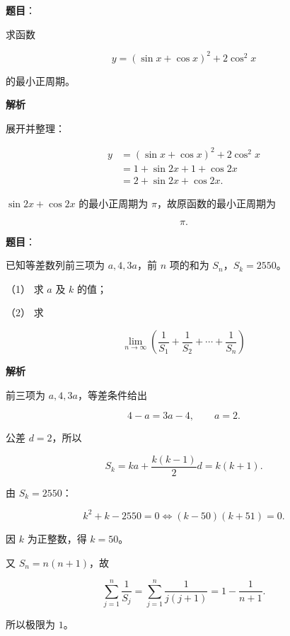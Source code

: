 \begin{answer}

\textbf{题目}：

求函数

\nopagebreak[4]
\[
y=(\sin x+\cos x)^2+2\cos^2x
\]

的最小正周期。

\textbf{解析}

展开并整理：

\nopagebreak[4]
\[
\begin{aligned}
y
&=(\sin x+\cos x)^2+2\cos^2x\\
&=1+\sin2x+1+\cos2x\\
&=2+\sin2x+\cos2x.
\end{aligned}
\]

$\sin2x+\cos2x$ 的最小正周期为 $\pi$，故原函数的最小正周期为

\nopagebreak[4]
\[
\pi.
\]


\end{answer}
\begin{answer}

\textbf{题目}：

已知等差数列前三项为 $a,4,3a$，前 $n$ 项的和为 $S_n$，$S_k=2550$。

（1） 求 $a$ 及 $k$ 的值；

（2） 求

\nopagebreak[4]
\[
\lim_{n\to\infty}\left(\frac1{S_1}+\frac1{S_2}+\cdots+\frac1{S_n}\right)
\]

\textbf{解析}


前三项为 $a,4,3a$，等差条件给出

\nopagebreak[4]
\[
4-a=3a-4,
\qquad a=2.
\]

公差 $d=2$，所以

\nopagebreak[4]
\[
S_k=ka+\frac{k(k-1)}2d=k(k+1).
\]

由 $S_k=2550$：

\nopagebreak[4]
\[
k^2+k-2550=0
\Longleftrightarrow (k-50)(k+51)=0.
\]

因 $k$ 为正整数，得 $k=50$。


又 $S_n=n(n+1)$，故

\nopagebreak[4]
\[
\sum_{j=1}^n\frac1{S_j}
=\sum_{j=1}^n\frac1{j(j+1)}
=1-\frac1{n+1}.
\]

所以极限为 $1$。



\end{answer}
